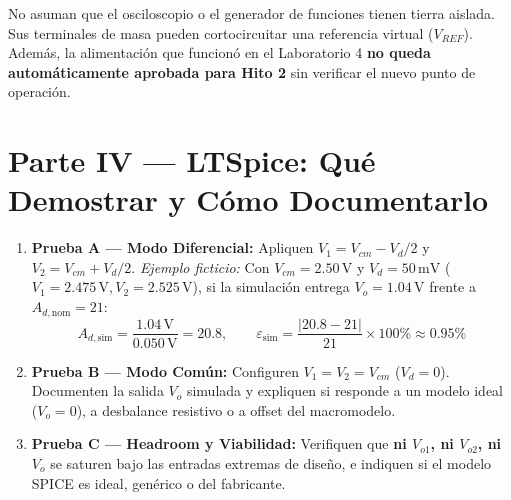 \documentclass[10pt, a4paper]{article}
\begin{document}
\begin{tcolorbox}[colback=warnbg, colframe=red!70!black, title=\textbf{Advertencia Eléctrica Imprescindible}]
    \raggedright
    No asuman que el osciloscopio o el generador de funciones tienen tierra aislada. Sus terminales de masa pueden cortocircuitar una referencia virtual ($V_{REF}$). Además, la alimentación que funcionó en el Laboratorio 4 \textbf{no queda automáticamente aprobada para Hito 2} sin verificar el nuevo punto de operación.
\end{tcolorbox}

\section*{Parte IV — LTSpice: Qué Demostrar y Cómo Documentarlo}
\begin{enumerate}
    \setlength{\itemsep}{2pt}
    \item \textbf{Prueba A — Modo Diferencial:} Apliquen $V_1 = V_{cm} - V_d/2$ y $V_2 = V_{cm} + V_d/2$. \textit{Ejemplo ficticio:} Con $V_{cm}=2.50\,\text{V}$ y $V_d=50\,\text{mV}$ ($V_1=2.475\,\text{V}, V_2=2.525\,\text{V}$), si la simulación entrega $V_o = 1.04\,\text{V}$ frente a $A_{d,\mathrm{nom}}=21$:
    \begin{equation}
        A_{d,\mathrm{sim}} = \frac{1.04\,\text{V}}{0.050\,\text{V}} = 20.8, \qquad \varepsilon_{\mathrm{sim}} = \frac{|20.8 - 21|}{21}\times 100\% \approx 0.95\%
    \end{equation}
    \item \textbf{Prueba B — Modo Común:} Configuren $V_1 = V_2 = V_{cm}$ ($V_d = 0$). Documenten la salida $V_o$ simulada y expliquen si responde a un modelo ideal ($V_o=0$), a desbalance resistivo o a offset del macromodelo.
    \item \textbf{Prueba C — Headroom y Viabilidad:} Verifiquen que \textbf{ni $V_{o1}$, ni $V_{o2}$, ni $V_o$} se saturen bajo las entradas extremas de diseño, e indiquen si el modelo SPICE es ideal, genérico o del fabricante.
\end{enumerate}
\end{document}

